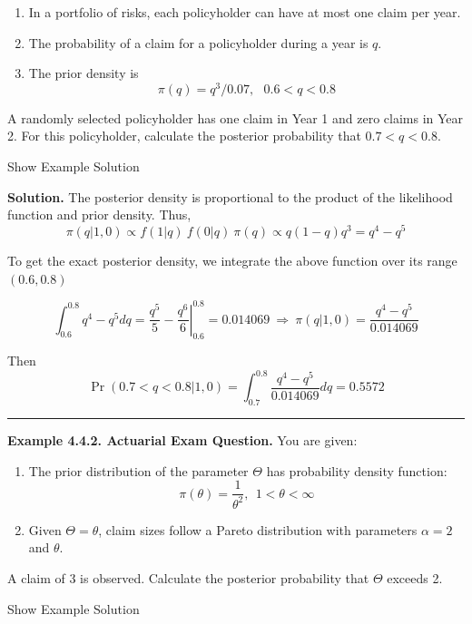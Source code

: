 \documentclass[]{book}
\providecommand{\tightlist}{%
  \setlength{\itemsep}{0pt}\setlength{\parskip}{0pt}}
\theoremstyle{definition}
\theoremstyle{definition}
\theoremstyle{definition}
\theoremstyle{remark}
\begin{document}
\begin{enumerate}
\def\labelenumi{(\roman{enumi})}
\tightlist
\item
  In a portfolio of risks, each policyholder can have at most one claim
  per year.
\item
  The probability of a claim for a policyholder during a year is \(q\).
\item
  The prior density is \[\pi(q) = q^3/0.07, \ \ \ 0.6 < q < 0.8\]
\end{enumerate}

A randomly selected policyholder has one claim in Year 1 and zero claims
in Year 2. For this policyholder, calculate the posterior probability
that \(0.7 < q < 0.8\).

Show Example Solution

\hypertarget{toggleExampleSelect.4.1}{}
\textbf{Solution.} The posterior density is proportional to the product
of the likelihood function and prior density. Thus,
\[\pi(q|1,0) \propto f(1|q)\ f(0|q)\ \pi(q) \propto q(1-q)q^3 = q^4-q^5\]

To get the exact posterior density, we integrate the above function over
its range \((0.6, 0.8)\)

\[\int_{0.6}^{0.8} q^4-q^5 dq = \frac{q^5}{5} - \left. \frac{q^6}{6} \right|_{0.6}^{0.8} = 0.014069 \ \Rightarrow \ \pi(q|1,0)=\frac{q^4-q^5}{0.014069}\]

Then
\[\Pr(0.7<q<0.8|1,0)= \int_{0.7}^{0.8} \frac{q^4-q^5}{0.014069}dq = 0.5572\]

\begin{center}\rule{0.5\linewidth}{\linethickness}\end{center}

\textbf{Example 4.4.2. Actuarial Exam Question.} You are given:

\begin{enumerate}
\def\labelenumi{(\roman{enumi})}
\tightlist
\item
  The prior distribution of the parameter \(\Theta\) has probability
  density function:
  \[\pi(\theta) = \frac{1}{\theta^2}, \ \ 1 < \theta < \infty\]
\item
  Given \(\Theta = \theta\), claim sizes follow a Pareto distribution
  with parameters \(\alpha=2\) and \(\theta\).
\end{enumerate}

A claim of 3 is observed. Calculate the posterior probability that
\(\Theta\) exceeds 2.

Show Example Solution
\end{document}
